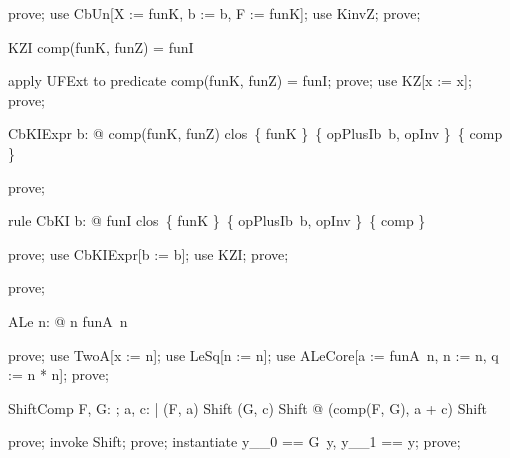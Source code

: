 \documentclass{article}
\begin{document}
\begin{zproof}
prove;
use CbUn[X := funK, b := b, F := funK];
use KinvZ;
prove;
\end{zproof}

\begin{theorem}{KZI}
  comp(funK, funZ) = funI
\end{theorem}

\begin{zproof}
apply UFExt to predicate comp(funK, funZ) = funI;
prove;
use KZ[x := x];
prove;
\end{zproof}

\begin{theorem}{CbKIExpr}
  \forall b: \nat @ comp(funK, funZ) \in clos~\{ funK \}~\{ opPlusIb~b, opInv \}~\{ comp \}
\end{theorem}

\begin{zproof}
prove;
\end{zproof}

\begin{theorem}{rule CbKI}
  \forall b: \nat @ funI \in clos~\{ funK \}~\{ opPlusIb~b, opInv \}~\{ comp \}
\end{theorem}

\begin{zproof}
prove;
use CbKIExpr[b := b];
use KZI;
prove;
\end{zproof}


\begin{zproof}
prove;
\end{zproof}

\begin{theorem}{ALe}
  \forall n: \nat @ n \leq funA~n
\end{theorem}

\begin{zproof}
prove;
use TwoA[x := n];
use LeSq[n := n];
use ALeCore[a := funA~n, n := n, q := n * n];
prove;
\end{zproof}

\begin{theorem}{ShiftComp}
  \forall F, G: \nat \fun \nat; a, c: \nat | (F, a) \in Shift \land (G, c) \in Shift @ (comp(F, G), a + c) \in Shift
\end{theorem}

\begin{zproof}
prove;
invoke Shift;
prove;
instantiate y\_\_0 == G~y, y\_\_1 == y;
prove;
\end{zproof}
\end{document}

